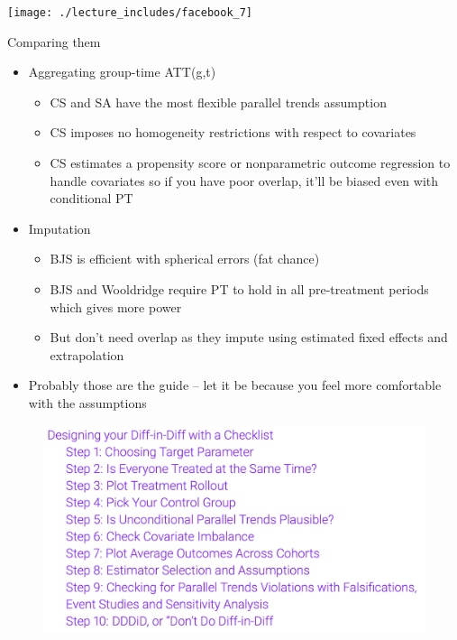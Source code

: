\documentclass{beamer}
\begin{document}
\begin{frame}
\begin{center}
\texttt{[image: ./lecture\_includes/facebook\_7]}
\end{center}
\end{frame}




\begin{frame}{Comparing them}

\begin{itemize}
\item Aggregating group-time ATT(g,t)
	\begin{itemize}
	\item CS and SA have the most flexible parallel trends assumption
	\item CS imposes no homogeneity restrictions with respect to covariates
	\item CS estimates a propensity score or nonparametric outcome regression to handle covariates so if you have poor overlap, it'll be biased even with conditional PT
	\end{itemize}
\item Imputation
	\begin{itemize}
	\item BJS is efficient with spherical errors (fat chance)
	\item BJS and Wooldridge require PT to hold in all pre-treatment periods which gives more power
	\item But don't need overlap as they impute using estimated fixed effects and extrapolation
	\end{itemize}
\item Probably those are the guide -- let it be because you feel more comfortable with the assumptions
\end{itemize}
\end{frame}

\begin{frame}

\begin{figure}
    \centering
    \includegraphics[width=\textwidth]{./lecture_includes/checklist}
\end{figure}

\end{frame}
\end{document}
